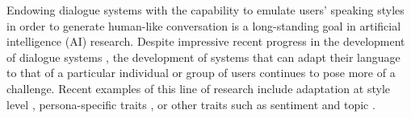 

Endowing dialogue systems with the capability to emulate users' speaking styles in order to generate human-like conversation is a long-standing goal in artificial intelligence (AI) research. 
Despite impressive recent progress in the development of dialogue systems \citep{mctear2020conversational}, the development of systems that can adapt their language to that of a particular individual or group of users continues to pose more of a challenge.
Recent examples of this line of research include adaptation at style level \citep{ficler-goldberg-2017-controlling}, persona-specific traits \citep{zhang-etal-2018-personalizing}, or other traits such as sentiment and topic \citep{madotto-etal-2020-plug}.

